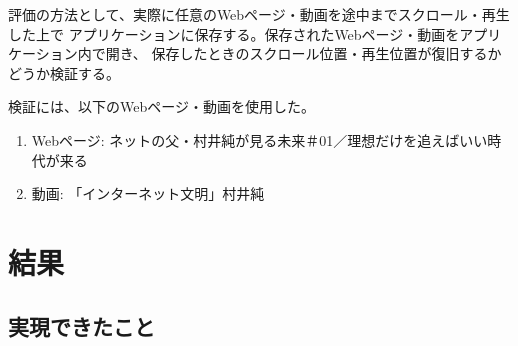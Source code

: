 \documentclass[a4j,10pt]{jsarticle}
\begin{document}
評価の方法として、実際に任意のWebページ・動画を途中までスクロール・再生した上で
アプリケーションに保存する。保存されたWebページ・動画をアプリケーション内で開き、
保存したときのスクロール位置・再生位置が復旧するかどうか検証する。

検証には、以下のWebページ・動画を使用した。
\begin{enumerate}
\item Webページ: ネットの父・村井純が見る未来＃01／理想だけを追えばいい時代が来る\cite{murai-web-page}
\item 動画: 「インターネット文明」村井純\cite{murai-video}
\end{enumerate}

\section{結果}
\subsection{実現できたこと}
\end{document}

